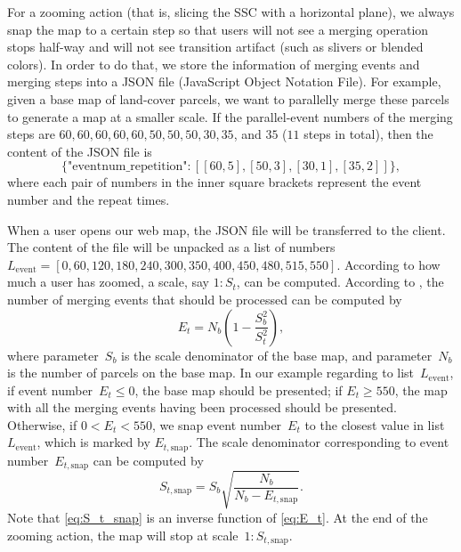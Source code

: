 \documentclass[ijgi,article,submit,moreauthors,pdftex]{Definitions/mdpi}
\begin{document}
For a zooming action
(that is, slicing the SSC with a horizontal plane), 
we always snap the map to a certain step
so that users will not see a merging operation stops half-way
and will not see transition artifact (such as slivers or blended colors).
In order to do that, we store the information of
merging events and merging steps into 
a JSON file (JavaScript Object Notation File).
For example, given a base map of land-cover parcels,
we want to parallelly merge these parcels to generate a map
at a smaller scale.
If the parallel-event numbers of the merging steps are 
$60, 60, 60, 60, 60, 50, 50, 50, 30, 35$, and $35$ ($11$ steps in total),
then the content of the JSON file is
$$
\{\textrm{"eventnum\_repetition"}: [[60, 5], [50, 3], [30, 1], [35, 2]]\},
$$
where each pair of numbers in the inner square brackets 
represent the event number and the repeat times.


When a user opens our web map,
the JSON file will be transferred to the client.
The content of the file will be unpacked as 
a list of numbers~$L_\mathrm{event} = 
[0, 60, 120, 180, 240, 300, 350, 400, 450, 480, 515, 550]$.
According to how much a user has zoomed,
a scale, say $1:S_t$, can be computed.
According to \citet{Huang2016Webmap},
the number of merging events that should be processed can be computed by
\begin{equation}
\label{eq:E_t}
E_t = N_b \left(1-\frac{S^2_b}{S^2_t}\right),
\end{equation}
where parameter~$S_b$ is the scale denominator of the base map,
and parameter~$N_b$ is the number of parcels on the base map.
In our example regarding to list~$L_\mathrm{event}$,
if event number~$E_t \le 0$, the base map should be presented;
if $E_t \ge 550$, the map with all the merging events having been processed
should be presented.
Otherwise, if $0<E_t < 550$, we snap event number~$E_t$ 
to the closest value in list~$L_\mathrm{event}$,
which is marked by $E_{t,\mathrm{snap}}$.
The scale denominator corresponding to event number~$E_{t,\mathrm{snap}}$
can be computed by 
\begin{equation}
\label{eq:S_t_snap}
S_{t,\mathrm{snap}} = S_b \sqrt{\frac{N_b}{N_b-E_{t,\mathrm{snap}}}}.
\end{equation}
Note that \eq\ref{eq:S_t_snap} is an inverse function of \eq\ref{eq:E_t}.
At the end of the zooming action, 
the map will stop at scale~$1:S_{t,\mathrm{snap}}$.


\end{document}
